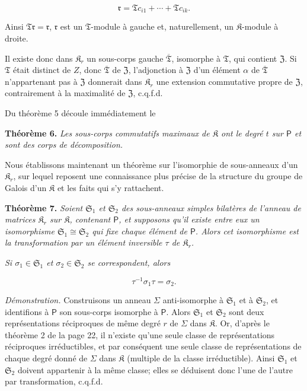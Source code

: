 \[
\mathfrak r=\mathfrak T c_{i1}+\cdots+\mathfrak T c_{ik}.
\]

Ainsi \(\mathfrak T\mathfrak r=\mathfrak r\), \(\mathfrak r\) est un \(\mathfrak T\)-module à gauche et, naturellement, un \(\mathfrak K\)-module à droite.

Il existe donc dans \(\mathfrak K_r\) un sous-corps gauche \(\overline{\mathfrak T}\), isomorphe à \(\mathfrak T\), qui contient \(\mathfrak Z\). Si \(\mathfrak T\) était distinct de \(Z\), donc \(\overline{\mathfrak T}\) de \(\mathfrak Z\), l'adjonction à \(\mathfrak Z\) d'un élément \(\alpha\) de \(\overline{\mathfrak T}\) n'appartenant pas à \(\mathfrak Z\) donnerait dans \(\mathfrak K_r\) une extension commutative propre de \(\mathfrak Z\), contrairement à la maximalité de \(\mathfrak Z\), c.q.f.d.

Du théorème 5 découle immédiatement le

\textbf{Théorème 6.} \emph{Les sous-corps commutatifs maximaux de \(\mathfrak K\) ont le degré \(t\) sur \(\mathsf P\) et sont des corps de décomposition.}

Nous établissons maintenant un théorème sur l'isomorphie de sous-anneaux d'un \(\mathfrak K_r\), sur lequel reposent une connaissance plus précise de la structure du groupe de Galois d'un \(\mathfrak K\) et les faits qui s'y rattachent.

\textbf{Théorème 7.} \emph{Soient \(\mathfrak S_1\) et \(\mathfrak S_2\) des sous-anneaux simples bilatères de l'anneau de matrices \(\mathfrak K_r\) sur \(\mathfrak K\), contenant \(\mathsf P\), et supposons qu'il existe entre eux un isomorphisme \(\mathfrak S_1\cong\mathfrak S_2\) qui fixe chaque élément de \(\mathsf P\). Alors cet isomorphisme est la transformation par un élément inversible \(\tau\) de \(\mathfrak K_r\).}

\emph{Si \(\sigma_1\in\mathfrak S_1\) et \(\sigma_2\in\mathfrak S_2\) se correspondent, alors}

\[
\tau^{-1}\sigma_1\tau=\sigma_2.
\]

\emph{Démonstration.} Construisons un anneau \(\Sigma\) anti-isomorphe à \(\mathfrak S_1\) et à \(\mathfrak S_2\), et identifions à \(\mathsf P\) son sous-corps isomorphe à \(\mathsf P\). Alors \(\mathfrak S_1\) et \(\mathfrak S_2\) sont deux représentations réciproques de même degré \(r\) de \(\Sigma\) dans \(\mathfrak K\). Or, d'après le théorème 2 de la page 22, il n'existe qu'une seule classe de représentations réciproques irréductibles, et par conséquent une seule classe de représentations de chaque degré donné de \(\Sigma\) dans \(\mathfrak K\) (multiple de la classe irréductible). Ainsi \(\mathfrak S_1\) et \(\mathfrak S_2\) doivent appartenir à la même classe; elles se déduisent donc l'une de l'autre par transformation, c.q.f.d.

